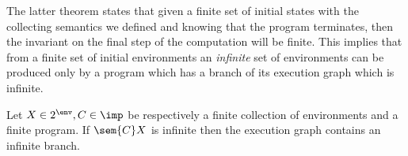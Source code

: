 \begin{observation}\label{obs:finite}
  The latter theorem states that given a finite set of initial states
  with the collecting semantics we defined and knowing that the
  program terminates, then the invariant on the final step of the
  computation will be finite. This implies that from a finite set of
  initial environments an \emph{infinite} set of environments can be
  produced only by a program which has a branch of its execution graph
  which is infinite.
\end{observation}

\begin{lemma}\label{le:infinitebranch}
  Let \(X\in2^\env, C\in\imp\) be respectively a finite collection of
  environments and a finite program. If \(\sem{C}X\) is infinite then
  the execution graph contains an infinite branch.
\end{lemma}

